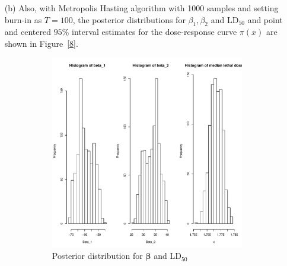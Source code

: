 \documentclass[]{article}
\begin{document}
\begin{enumerate}
{\begin{itemize}
        	\item[(b)]
        	Also, with Metropolis Hasting algorithm with 1000 samples and setting burn-in as $T = 100$, the posterior distributions for $\beta_1, \beta_2$ and $\mathrm{LD}_{50}$ and point and centered $95\%$ interval estimates for the dose-response curve $\pi(x)$ are shown in Figure~\ref{8}.
        	\begin{figure}
        		\centering
        		\begin{subfigure}{0.45\linewidth}
        			\includegraphics[width = \textwidth]{pic/HW3_2/b1.pdf}
        			\caption{Posterior distribution for $\bm{\beta}$ and $\mathrm{LD}_{50}$}
        		\end{subfigure}
        		\begin{subfigure}{0.45\linewidth}

\end{subfigure}
\end{figure}
\end{itemize}}
\end{enumerate}
\end{document}
